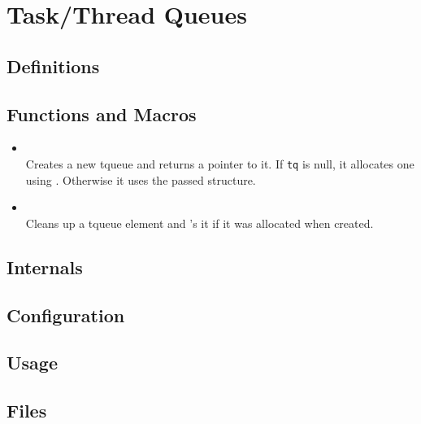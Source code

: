 \section{Task/Thread Queues}

\subsection{Definitions}

\subsection{Functions and Macros}

\begin{itemize}
\item {} \\
Creates a new tqueue and returns a pointer to it. If \texttt{tq} is null, it allocates
one using . Otherwise it uses the passed structure.

\item {} \\
Cleans up a tqueue element and 's it if it was allocated when created.
\end{itemize}
\subsection{Internals}

\subsection{Configuration}


\subsection{Usage}

\subsection{Files}
